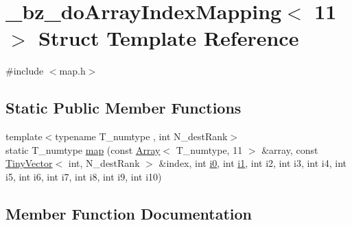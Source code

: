\hypertarget{struct__bz__doArrayIndexMapping_3_0111_01_4}{}\section{\+\_\+bz\+\_\+do\+Array\+Index\+Mapping$<$ 11 $>$ Struct Template Reference}
\label{struct__bz__doArrayIndexMapping_3_0111_01_4}


{\ttfamily \#include $<$map.\+h$>$}

\subsection*{Static Public Member Functions}
\begin{DoxyCompactItemize}
\item 
{\footnotesize template$<$typename T\+\_\+numtype , int N\+\_\+dest\+Rank$>$ }\\static T\+\_\+numtype \hyperlink{struct__bz__doArrayIndexMapping_3_0111_01_4_a5e07bfb6cf5a0db9dee37e02f2c2284d}{map} (const \hyperlink{classArray}{Array}$<$ T\+\_\+numtype, 11 $>$ \&array, const \hyperlink{classTinyVector}{Tiny\+Vector}$<$ int, N\+\_\+dest\+Rank $>$ \&index, int \hyperlink{cephes_8h_aacd2643d920288e61be16787561a4514}{i0}, int \hyperlink{cephes_8h_ab24474d03df1f9adf1700c2c1badd1a5}{i1}, int i2, int i3, int i4, int i5, int i6, int i7, int i8, int i9, int i10)
\end{DoxyCompactItemize}


\subsection{Member Function Documentation}
\hypertarget{struct__bz__doArrayIndexMapping_3_0111_01_4_a5e07bfb6cf5a0db9dee37e02f2c2284d}{}
